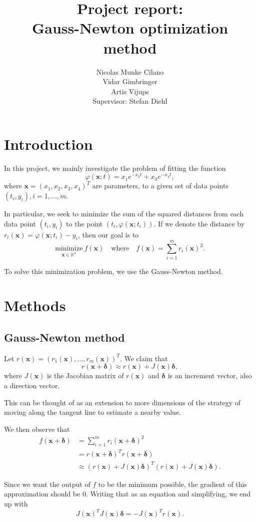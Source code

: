 \documentclass[12pt, a4paper]{article}
\title{Project report:
\\ Gauss-Newton optimization method}
\author{Nicolas Munke Cilano
\\ Vidar Gimbringer 
\\ Artis Vijups 
\vspace{20pt} \\ Supervisor: Stefan Diehl}
\newcommand{\bx}{{\boldsymbol{x}}}
\newcommand{\bd}{{\boldsymbol{\delta}}}
\begin{document}
\maketitle

\section{Introduction}

In this project, we mainly investigate the problem of fitting the function \[\varphi(\bx; t)=x_1e^{-x_2t}+x_3e^{-x_4t},\] where $\bx={(x_1,x_2,x_3,x_4)}^{T}$ are parameters, to a given set of data points $(t_i,y_i), i=1,\ldots,m$.

In particular, we seek to minimize the sum of the squared distances from each data point $(t_i,y_i)$ to the point $(t_i,\varphi(\bx; t_i))$. If we denote the distance by $r_i(\bx)=\varphi(\bx; t_i)-y_i$, then our goal is to \[\underset{\bx\in\mathbb{R}^4}{\text{minimize}}~f(\bx)\quad\text{where}\quad f(\bx)=\sum_{i=1}^{m}{r_i(\bx)}^2.\]

To solve this minimization problem, we use the Gauss-Newton method.

\section{Methods}

\subsection{Gauss-Newton method}

Let $r(\bx)={(r_1(\bx),\ldots,r_m(\bx))}^T$. We claim that \[r(\bx+\bd)\approx r(\bx)+J(\bx)\bd,\]where $J(\bx)$ is the Jacobian matrix of $r(\bx)$ and $\bd$ is an increment vector, also a direction vector.

This can be thought of as an extension to more dimensions of the strategy of moving along the tangent line to estimate a nearby value.

We then observe that \begin{align*}
f(\bx+\bd) &= \sum_{i=1}^{m}{r_i(\bx+\bd)}^2 \\ 
&= {r(\bx+\bd)}^T r(\bx+\bd) \\
&\approx {(r(\bx)+J(\bx)\bd)}^T (r(\bx)+J(\bx)\bd).
\end{align*}

Since we want the output of $f $ to be the minimum possible, the gradient of this approximation should be $0$. Writing that as an equation and simplifying, we end up with \[{J(\bx)}^T J(\bx)\bd=-{J(\bx)}^T r(\bx).\]
\end{document}
